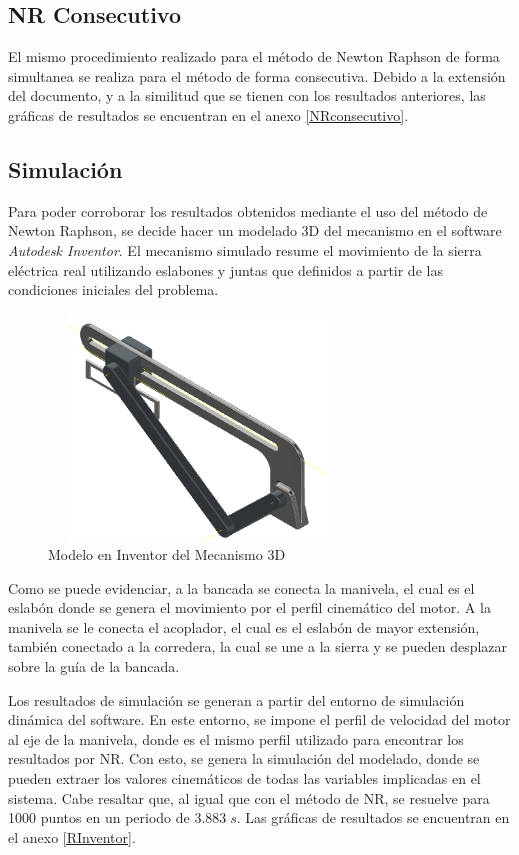 \documentclass[12pt]{article}
\begin{document}
\subsection{NR Consecutivo}
El mismo procedimiento realizado para el método de Newton Raphson de forma simultanea se realiza para el método de forma consecutiva. Debido a la extensión del documento, y a la similitud que se tienen con los resultados anteriores, las gráficas de resultados se encuentran en el anexo \ref{NRconsecutivo}.
\subsection{Simulación}
Para poder corroborar los resultados obtenidos mediante el uso del método de Newton Raphson, se decide hacer un modelado 3D del mecanismo en el software \textit{Autodesk Inventor}. El mecanismo simulado resume el movimiento de la sierra eléctrica real utilizando eslabones y juntas que definidos a partir de las condiciones iniciales del problema.
\begin{figure} [H]
    \centerline{\includegraphics[width=8cm, height=6cm,keepaspectratio]{Mecanismo 3D .png}}
    \caption{Modelo en Inventor del Mecanismo 3D}
    \label{}
\end{figure}
Como se puede evidenciar, a la bancada se conecta la manivela, el cual es el eslabón donde se genera el movimiento por el perfil cinemático del motor. A la manivela se le conecta el acoplador, el cual es el eslabón de mayor extensión, también conectado a la corredera, la cual se une a la sierra y se pueden desplazar sobre la guía de la bancada.

Los resultados de simulación se generan a partir del entorno de simulación dinámica del software. En este entorno, se impone el perfil de velocidad del motor al eje de la manivela, donde es el mismo perfil utilizado para encontrar los resultados por NR. Con esto, se genera la simulación del modelado, donde se pueden extraer los valores cinemáticos de todas las variables implicadas en el sistema. Cabe resaltar que, al igual que con el método de NR, se resuelve para 1000 puntos en un periodo de $3.883\;s$. Las gráficas de resultados se encuentran en el anexo \ref{RInventor}.
\end{document}
